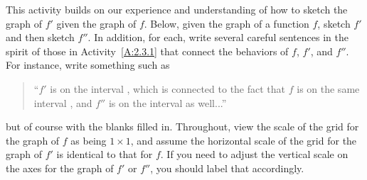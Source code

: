 


\begin{activity} \label{A:2.3.2}
This activity builds on our experience and understanding of how to sketch the graph of $f'$ given the graph of $f$.  Below, given the graph of a function $f$, sketch $f'$ and then sketch $f''$.  In addition, for each, write several careful sentences in the spirit of those in Activity~\ref{A:2.3.1} that connect the behaviors of $f$, $f'$, and $f''$.  For instance, write something such as
\begin{quote}
``$f'$ is \underline{\hspace{1.5in}} on the interval \underline{\hspace{0.5in}}, which is connected to the fact that $f$ is \underline{\hspace{1.5in}} on the same interval \underline{\hspace{0.5in}}, and $f''$ is \underline{\hspace{1.5in}} on the interval as well...''
\end{quote}
but of course with the blanks filled in.  Throughout, view the scale of the grid for the graph of $f$ as being $1 \times 1$, and assume the horizontal scale of the grid for the graph of $f'$ is identical to that for $f$.  If you need to adjust the vertical scale on the axes for the graph of $f'$ or $f''$, you should label that accordingly.
\end{activity}


